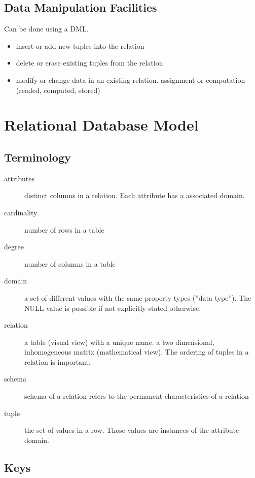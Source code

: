 \documentclass[a4paper,twocolumn]{article}
\begin{document}
\subsection{Data Manipulation Facilities}

Can be done using a DML.
%
\begin{itemize}
  \item insert or add new tuples into the relation
  \item delete or erase existing tuples from the relation
  \item modify or change data in an existing relation.
        assignment or computation (readed, computed, stored)
\end{itemize}

\section{Relational Database Model}

\subsection{Terminology}

\begin{description}
  \item[attributes]
    distinct columns in a relation.
    Each attribute has a associated domain.
  \item[cardinality]
    number of rows in a table
  \item[degree]
    number of columns in a table
  \item[domain]
    a set of different values with the same property types (''data type'').
    The NULL value is possible if not explicitly stated otherwise.
  \item[relation]
    a table (visual view) with a unique name.
    a two dimensional, inhomogeneous matrix (mathematical view).
    The ordering of tuples in a relation is important.
  \item[schema]
    schema of a relation refers to the permanent characteristics
    of a relation
  \item[tuple]
    the set of values in a row.
    Those values are instances of the attribute domain.
\end{description}

\subsection{Keys}
\end{document}
